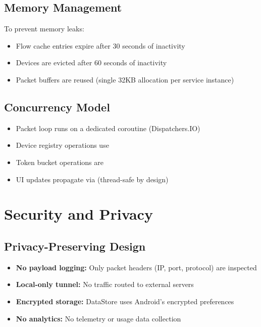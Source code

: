 \subsection{Memory Management}

To prevent memory leaks:
\begin{itemize}
    \item Flow cache entries expire after 30 seconds of inactivity
    \item Devices are evicted after 60 seconds of inactivity
    \item Packet buffers are reused (single 32KB allocation per service instance)
\end{itemize}

\subsection{Concurrency Model}

\begin{itemize}
    \item Packet loop runs on a dedicated coroutine (Dispatchers.IO)
    \item Device registry operations use 
    \item Token bucket operations are 
    \item UI updates propagate via  (thread-safe by design)
\end{itemize}

\section{Security and Privacy}
\label{sec:security-design}

\subsection{Privacy-Preserving Design}

\begin{itemize}
    \item \textbf{No payload logging:} Only packet headers (IP, port, protocol) are inspected
    \item \textbf{Local-only tunnel:} No traffic routed to external servers
    \item \textbf{Encrypted storage:} DataStore uses Android's encrypted preferences
    \item \textbf{No analytics:} No telemetry or usage data collection
\end{itemize}

